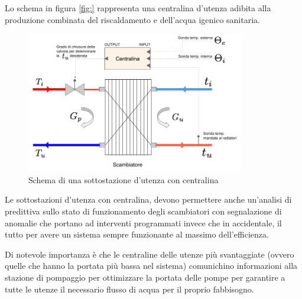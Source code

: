 \documentclass[laurea,oneside,11pt]{USiena_tesiLM}
\begin{document}
Lo schema in figura \ref{fig:} rappresenta una centralina d'utenza adibita alla produzione combinata del riscaldamento e dell'acqua igenico sanitaria.

\begin{figure}[!ht]
\centering
\includegraphics[width=0.85\textwidth]{figure/centralina} 
\caption{Schema di una sottostazione d'utenza con centralina}
\label{fig:centralina}
\end{figure}


Le sottostazioni d'utenza con centralina, devono permettere anche un'analisi di predittiva sullo stato di funzionamento degli scambiatori con segnalazione di anomalie che portano ad interventi programmati invece che in accidentale, il tutto per avere un sistema sempre funzionante al massimo dell'efficienza.

Di notevole importanza è che le centraline delle utenze più svantaggiate (ovvero quelle che hanno la portata più bassa nel sistema) comunichino informazioni alla stazione di pompaggio per ottimizzare la portata delle pompe per garantire a tutte le utenze il necessario flusso di acqua per il proprio fabbisogno. 

\end{document}
